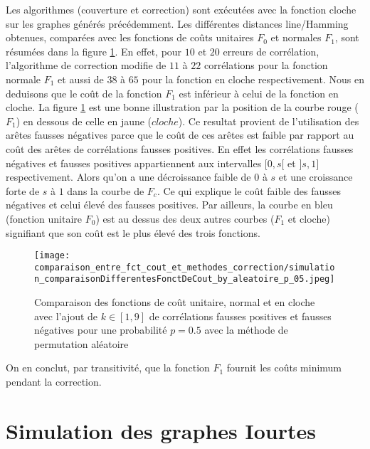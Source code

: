\documentclass[onecolumn, 12pt]{book}
\begin{document}
Les algorithmes (couverture et correction) sont ex\'ecut\'ees avec la fonction cloche sur les graphes g\'en\'er\'es pr\'ec\'edemment. 
Les diff\'erentes distances line/Hamming obtenues, compar\'ees avec les fonctions de co\^uts unitaires $F_0$ et normales $F_1$, sont r\'esum\'ees dans la figure \ref{comparaison_fct_cloche_unitaire_normal_p05}.
En effet, pour $10$ et $20$ erreurs de corr\'elation, l'algorithme de correction modifie  de $11$ \`a $22$ corr\'elations pour la fonction normale $F_1$ et aussi de $38$ \`a $65$ pour la fonction en cloche respectivement. 
Nous en deduisons que le co\^ut de la fonction $F_1$ est  inf\'erieur \`a celui de la fonction en cloche. 
La figure \ref{comparaison_fct_cloche_unitaire_normal_p05}  est une bonne illustration par la position de la courbe rouge ($F_1$) en dessous de celle en jaune ($cloche$).
\newline
Ce resultat provient de l'utilisation des ar\^etes fausses n\'egatives parce que le co\^ut de ces ar\^etes est faible par rapport au co\^ut des ar\^etes de corr\'elations fausses positives.
En effet les corr\'elations fausses n\'egatives et fausses positives appartiennent aux intervalles $[0,s[$ et $]s,1]$ respectivement. 
Alors qu'on a une d\'ecroissance faible de $0$ \`a $s$ et une croissance forte de $s$ \`a $1$ dans la courbe de $F_c$. 
Ce qui explique le co\^ut faible des fausses n\'egatives et celui \'elev\'e des fausses positives. 
Par ailleurs, la courbe en bleu (fonction unitaire $F_0$) est au dessus des deux autres courbes ($F_1$ et cloche) signifiant que son co\^ut est le plus \'elev\'e des trois fonctions.
\newline
\begin{centering} 
\begin{figure}[htb!] 
\texttt{[image: comparaison\_entre\_fct\_cout\_et\_methodes\_correction/simulation\_comparaisonDifferentesFonctDeCout\_by\_aleatoire\_p\_05.jpeg]}
\caption{ Comparaison des fonctions de co\^ut unitaire, normal et en cloche avec l'ajout de $k \in [1,9]$ de corr\'elations fausses positives et fausses n\'egatives pour une probabilit\'e $p = 0.5$ avec la m\'ethode de permutation al\'eatoire }
\label{comparaison_fct_cloche_unitaire_normal_p05} 
\end{figure}
\end{centering} 
On en conclut, par transitivit\'e, que la fonction $F_1$ fournit les co\^uts minimum pendant la correction.


\section{ Simulation des graphes Iourtes}
\end{document}
